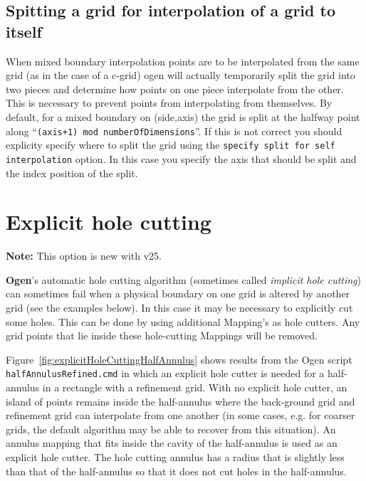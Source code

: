 \documentclass[xcolor=rgb,svgnames,dvipsnames]{article}
\newcommand{\ogen}{\homeHenshaw/Overture/ogen}
\begin{document}

\subsection{Spitting a grid for interpolation of a grid to itself}

  When mixed boundary interpolation points are to be interpolated from the same grid (as in the
case of a c-grid) ogen will actually temporarily split the grid into two pieces and determine how points
on one piece interpolate from the other. This is necessary to prevent points from interpolating from
themselves. By default, for a mixed boundary on (side,axis) the grid is split at the halfway point
along ``{\tt (axis+1) mod numberOfDimensions}''. 
If this is not correct you should explicity
specify where to split the grid using the {\tt specify split for self interpolation} option.
In this case you specify the axis that should be split and the index position of the split.




\clearpage
\section{Explicit hole cutting}\label{sec:explicitHoleCutting}

{\bf Note:} This option is new with v25. 

{\bf Ogen}'s automatic hole cutting algorithm (sometimes called {\em implicit hole cutting}) can sometimes
fail when a physical boundary on one grid is altered by another grid (see the examples below). 
In this case it may be necessary to explicitly cut some holes. This can be done by using additional Mapping's
as hole cutters. Any grid points that lie inside these hole-cutting Mappings will be removed. 


Figure~\ref{fig:explicitHoleCuttingHalfAnnulus} shows results from the Ogen script {\tt halfAnnulusRefined.cmd} in which
an explicit hole cutter is needed for a half-annulus in a rectangle with a refinement grid.
With no explicit hole cutter, an island of points remains inside the half-annulus where the back-ground 
grid and refinement grid can interpolate from one another (in some cases, e.g. for coarser grids,
the default algorithm may be able to recover from this situation). 
An annulus mapping that fits inside the cavity of the 
half-annulus is used as an explicit hole cutter. The hole cutting annulus has a radius that is slightly less than that
of the half-annulus so that it does not cut holes in the half-annulus. 
\end{document}
